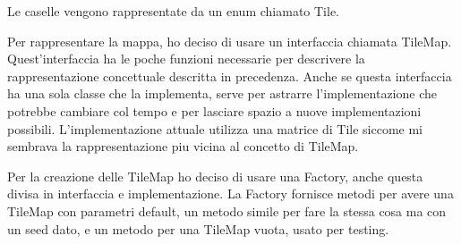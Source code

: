 \documentclass[a4paper,12pt]{report}
\begin{document}
    \par Le caselle vengono rappresentate da un enum chiamato Tile.

    \par
    \par Per rappresentare la mappa, ho deciso di usare un interfaccia chiamata TileMap.
    Quest'interfaccia ha le poche funzioni necessarie per descrivere la rappresentazione concettuale
    descritta in precedenza.
    Anche se questa interfaccia ha una sola classe che la implementa,
    serve per astrarre l'implementazione che potrebbe cambiare col tempo
    e per lasciare spazio a nuove implementazioni possibili.
    L'implementazione attuale utilizza una matrice di Tile siccome mi sembrava la rappresentazione piu vicina al concetto di TileMap.

    \par
    \par Per la creazione delle TileMap ho deciso di usare una Factory,
    anche questa divisa in interfaccia e implementazione.
    La Factory fornisce metodi per avere una TileMap con parametri default,
    un metodo simile per fare la stessa cosa ma con un seed dato,
    e un metodo per una TileMap vuota, usato per testing.
\end{document}
